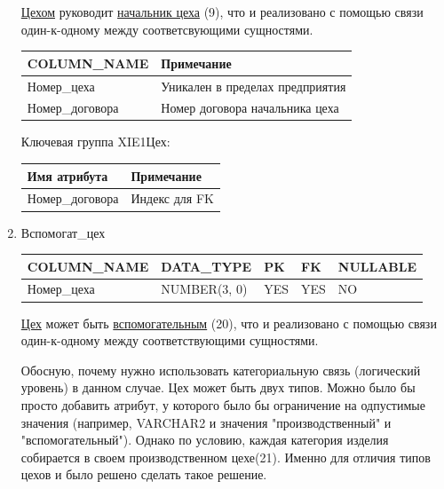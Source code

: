 \begin{enumerate}
\begin{tabular}{|p{4cm}|p{3cm}|p{1cm}|p{1cm}|p{2cm}|}
    \end{tabular}

    \underline{Цехом} руководит \underline{начальник цеха} (9), что и реализовано с помощью связи один-к-одному между соответсвующими сущностями.

    \begin{tabular}{|p{4cm}|p{5cm}|} \hline

        {\bf COLUMN\_NAME} & {\bf Примечание} \\ \hline
        Номер\_цеха & Уникален в пределах предприятия \\ \hline
        Номер\_договора & Номер договора начальника цеха \\ \hline

    \end{tabular}

    Ключевая группа XIE1Цех:

    \begin{tabular}{|p{4cm}|p{5cm}|} \hline

        {\bf Имя атрибута} & {\bf Примечание} \\ \hline
        Номер\_договора & Индекс для FK \\ \hline

    \end{tabular}

    \item{Вспомогат\_цех}

    \begin{tabular}{|p{4cm}|p{3cm}|p{1cm}|p{1cm}|p{2cm}|} \hline

        {\bf COLUMN\_NAME} & {\bf DATA\_TYPE} & {\bf PK} & {\bf FK} & {\bf NULLABLE} \\ \hline
        Номер\_цеха & NUMBER(3, 0) & YES & YES & NO \\ \hline

    \end{tabular}

   \underline{Цех} может быть \underline{вспомогательным} (20), что и реализовано с помощью связи один-к-одному между соответствующими сущностями.

    Обосную, почему нужно использовать категориальную связь (логический уровень) в данном случае.
    Цех может быть двух типов.
    Можно было бы просто добавить атрибут, у которого было бы ограничение на одпустимые значения (например, VARCHAR2 и значения "производственный" и "вспомогательный").
    Однако по условию, каждая категория изделия собирается в своем производственном цехе(21).
    Именно для отличия типов цехов и было решено сделать такое решение.


\end{enumerate}
